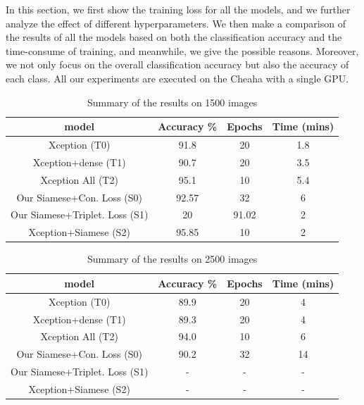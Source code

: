 In this section, we first show the training loss for all the models, and we further analyze the effect of different hyperparameters. We then make a comparison of the results of all the models based on both the classification accuracy and the time-consume of training, and meanwhile, we give the possible reasons. Moreover, we not only focus on the overall classification accuracy but also the accuracy of each class. All our experiments are executed on the Cheaha with a single GPU. 

\begin{table}[ht]
    \caption{Summary of the results on 1500 images} 
    \centering 
    \begin{tabular}{c c c c} 
    \hline\hline 
    
    model & Accuracy \% & Epochs & Time (mins)  \\%
    \hline %
    Xception (T0) & 91.8 & 20 & 1.8 \\%
    Xception+dense (T1) & 90.7 & 20 & 3.5 \\%
    Xception All (T2) & 95.1 & 10 & 5.4 \\%
    Our Siamese+Con. Loss (S0) & 92.57 & 32 & 6 \\%
    Our Siamese+Triplet. Loss (S1) & 20 & 91.02 & 2 \\%
    Xception+Siamese (S2) & 95.85 & 10 & 2 \\%
    \hline 
    \end{tabular}
\label{table:data} %
\end{table}

\begin{table}[ht]
    \caption{Summary of the results on 2500 images} 
    \centering 
    \begin{tabular}{c c c c} 
    \hline\hline 
    
    model & Accuracy \% & Epochs & Time (mins)  \\%
    \hline %
    Xception (T0) & 89.9 & 20 & 4 \\%
    Xception+dense (T1) & 89.3 & 20 & 4 \\%
    Xception All (T2) & 94.0 & 10 & 6 \\%
    Our Siamese+Con. Loss (S0) & 90.2 & 32 & 14 \\%
    Our Siamese+Triplet. Loss (S1) & - & - & - \\%
    Xception+Siamese (S2) & - & - & - \\%
    \hline 
    \end{tabular}
\label{table:data} %
\end{table}

